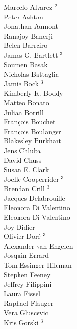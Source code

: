 \documentclass[PICOReport.tex]{subfiles}
\begin{document}
{{\begin{multicols}{4}
Marcelo Alvarez $^2$                \\
Peter Ashton                    \\
Jonathan Aumont                 \\
Ranajoy Banerji                 \\
Belen Barreiro                  \\
James G. Bartlett $^3$              \\
Soumen Basak                    \\
Nicholas Battaglia              \\
Jamie Bock $^3$                     \\
Kimberly K. Boddy               \\
Matteo Bonato                   \\
Julian Borrill                  \\
Fran\c{c}ois Bouchet            \\
Fran\c{c}ois Boulanger          \\
Blakesley Burkhart              \\
Jens Chluba                     \\
David Chuss                     \\
Susan E. Clark                  \\
Joelle Cooperrider $^3$         \\
Brendan Crill $^3$                 \\
Jacques Delabrouille            \\
Eleonora Di Valentino           \\
Eleonora Di Valentino           \\
Joy Didier                      \\
Olivier Dor\'e  $^3$                 \\
Alexander van Engelen           \\
Josquin Errard                  \\
Tom Essinger-Hileman            \\
Stephen Feeney                  \\
Jeffrey Filippini               \\
Laura Fissel                    \\
Raphael Flauger                 \\
Vera Gluscevic                  \\
Kris Gorski  $^3$                   \\

\end{multicols}}}
\end{document}
